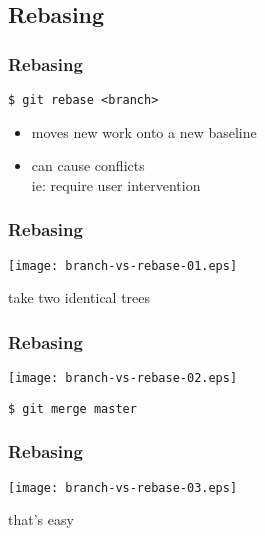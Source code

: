 \documentclass[english]{beamer}
\newcommand{\mysubsection}[2]{%
  \hypertarget{#2}{}%
  \subsection{#1}%
  \label{#2}%
}
\newcommand{\CMD}[1]{%
\texttt{\textcolor{code-green}{#1}}%
}
\newcommand{\faint}[1]{%
\textcolor{code-gray}{#1}%
}
\newcommand{\red}[1]{%
\textcolor{code-red}{#1}%
}
\begin{document}
\mysubsection{Rebasing}{using:rebasing}
\begin{frame}
\frametitle{Rebasing}

\CMD{\$ git rebase <branch>} \\
\begin{itemize}
        \item moves new work onto a new baseline
        \item can cause \red{conflicts} \\
                \faint{ie: require user intervention}
\end{itemize}
\end{frame}

\begin{frame}
\frametitle{Rebasing}

\texttt{[image: branch-vs-rebase-01.eps]}
\vspace{\baselineskip}
\begin{center}
        take two identical trees
\end{center}
\vspace{\textheight}
\end{frame}

\begin{frame}
\frametitle{Rebasing}

\texttt{[image: branch-vs-rebase-02.eps]}
\vspace{\baselineskip}
\begin{flushleft}
        \CMD{\$ git merge master}
\end{flushleft}
\vspace{\textheight}
\end{frame}

\begin{frame}
\frametitle{Rebasing}

\texttt{[image: branch-vs-rebase-03.eps]}
\vspace{\baselineskip}
\begin{center}
        that's easy
\end{center}
\vspace{\textheight}
\end{frame}
\end{document}
